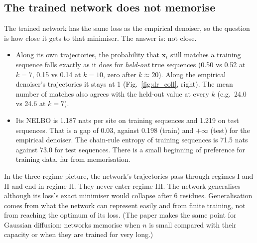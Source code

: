 \subsection{The trained network does not memorise}
The trained network has the same loss as the empirical denoiser, so the question is how close it gets to that
minimiser. The answer is: not close.
\begin{itemize}[nosep]
\item Along its own trajectories, the probability that $\bm x_t$ still matches a training sequence falls exactly as it
does for \emph{held-out} true sequences (0.50 vs 0.52 at $k=7$, 0.15 vs 0.14 at $k=10$, zero after $k\approx20$). Along
the empirical denoiser's trajectories it stays at 1 (Fig.~\ref{fig:dr_coll}, right). The mean number of matches also
agrees with the held-out value at every $k$ (e.g.\ 24.0 vs 24.6 at $k=7$).
\item Its NELBO is 1.187 nats per site on training sequences and 1.219 on test sequences. That is a gap of 0.03,
against 0.198 (train) and $+\infty$ (test) for the empirical denoiser. The chain-rule entropy of training sequences is
71.5 nats against 73.0 for test sequences. There is a small beginning of preference for training data, far from
memorisation.
\end{itemize}
In the three-regime picture, the network's trajectories pass through regimes I and II and end in regime II. They
never enter regime III. The network generalises although its loss's exact minimiser would collapse after 6 residues.
Generalisation comes from what the network can represent easily and from finite training, not from reaching the
optimum of its loss. (The paper makes the same point for Gaussian diffusion: networks memorise when $n$ is small
compared with their capacity or when they are trained for very long.)

